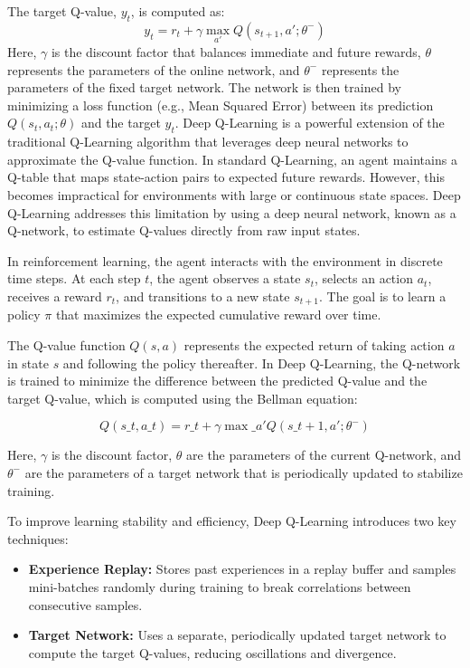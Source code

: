 \documentclass[16pt]{report}
\begin{document}
The target Q-value, $y_t$, is computed as:
\begin{equation}
y_t = r_t + \gamma \max_{a'} Q(s_{t+1}, a'; \theta^-)
\end{equation}
Here, $\gamma$ is the discount factor that balances immediate and future rewards, $\theta$ represents the parameters of the online network, and $\theta^-$ represents the parameters of the fixed target network. The network is then trained by minimizing a loss function (e.g., Mean Squared Error) between its prediction $Q(s_t, a_t; \theta)$ and the target $y_t$.
 Deep Q-Learning is a powerful extension of the traditional Q-Learning algorithm that leverages deep neural networks to approximate the Q-value function. In standard Q-Learning, an agent maintains a Q-table that maps state-action pairs to expected future rewards. However, this becomes impractical for environments with large or continuous state spaces. Deep Q-Learning addresses this limitation by using a deep neural network, known as a Q-network, to estimate Q-values directly from raw input states.

In reinforcement learning, the agent interacts with the environment in discrete time steps. At each step $t$, the agent observes a state $s_t$, selects an action $a_t$, receives a reward $r_t$, and transitions to a new state $s_{t+1}$. The goal is to learn a policy $\pi$ that maximizes the expected cumulative reward over time.

The Q-value function $Q(s, a)$ represents the expected return of taking action $a$ in state $s$ and following the policy thereafter. In Deep Q-Learning, the Q-network is trained to minimize the difference between the predicted Q-value and the target Q-value, which is computed using the Bellman equation:

\begin{equation}
Q(s\_t, a\_t) = r\_t + \gamma \max\_{a'} Q(s\_{t+1}, a'; \theta^-)
\end{equation}

Here, $\gamma$ is the discount factor, $\theta$ are the parameters of the current Q-network, and $\theta^-$ are the parameters of a target network that is periodically updated to stabilize training.

To improve learning stability and efficiency, Deep Q-Learning introduces two key techniques:
\begin{itemize}
\item \textbf{Experience Replay:} Stores past experiences in a replay buffer and samples mini-batches randomly during training to break correlations between consecutive samples.
\item \textbf{Target Network:} Uses a separate, periodically updated target network to compute the target Q-values, reducing oscillations and divergence.
\end{itemize}
\end{document}
